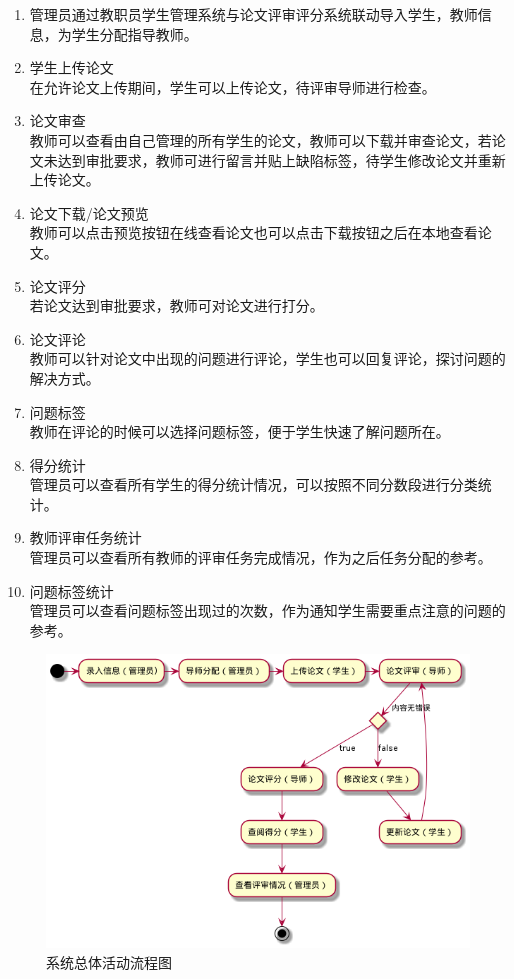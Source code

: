 \begin{enumerate}
    \item 管理员通过教职员学生管理系统与论文评审评分系统联动导入学生，教师信息，为学生分配指导教师。
    \item 学生上传论文\\
          在允许论文上传期间，学生可以上传论文，待评审导师进行检查。
    \item 论文审查\\
          教师可以查看由自己管理的所有学生的论文，教师可以下载并审查论文，若论文未达到审批要求，教师可进行留言并贴上缺陷标签，待学生修改论文并重新上传论文。
    \item 论文下载/论文预览\\
          教师可以点击预览按钮在线查看论文也可以点击下载按钮之后在本地查看论文。
    \item 论文评分\\
          若论文达到审批要求，教师可对论文进行打分。
    \item 论文评论\\
          教师可以针对论文中出现的问题进行评论，学生也可以回复评论，探讨问题的解决方式。
    \item 问题标签\\
          教师在评论的时候可以选择问题标签，便于学生快速了解问题所在。
    \item 得分统计\\
          管理员可以查看所有学生的得分统计情况，可以按照不同分数段进行分类统计。
    \item 教师评审任务统计\\
          管理员可以查看所有教师的评审任务完成情况，作为之后任务分配的参考。
    \item 问题标签统计\\
          管理员可以查看问题标签出现过的次数，作为通知学生需要重点注意的问题的参考。

\end{enumerate}

\begin{figure}[H]
    \centering
    \includegraphics[scale = 0.6]{out/uml/流程图/系统总体活动流程图/系统总体活动流程图.png}
    \caption{\song\wuhao 系统总体活动流程图}
\end{figure}


